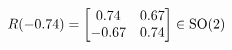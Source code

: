 \documentclass[preview]{standalone}
\begin{document}
\begin{align*}
\special{dvisvgm:raw <g id='unique000'>}R(-0.74) = \begin{bmatrix} 0.74 & 0.67 \\ -0.67 & 0.74 \end{bmatrix} \in \text{SO}(2)\special{dvisvgm:raw </g>}
\end{align*}
\end{document}
